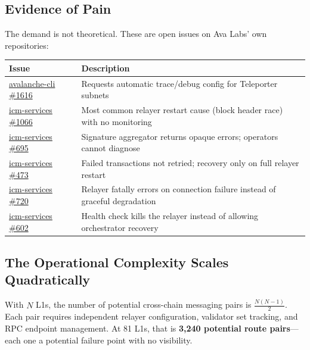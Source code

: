 \documentclass[11pt,a4paper]{article}
\begin{document}
\subsection{Evidence of Pain}

The demand is not theoretical. These are open issues on Ava Labs' own repositories:

\begin{table}[h]
\centering
\small
\begin{tabularx}{\textwidth}{@{}l L{10cm}@{}}
\toprule
\textbf{Issue} & \textbf{Description} \\
\midrule
\href{https://github.com/ava-labs/avalanche-cli/issues/1616}{avalanche-cli \#1616} & Requests automatic trace/debug config for Teleporter subnets \\
\href{https://github.com/ava-labs/icm-services/issues/1066}{icm-services \#1066} & Most common relayer restart cause (block header race) with no monitoring \\
\href{https://github.com/ava-labs/icm-services/issues/695}{icm-services \#695} & Signature aggregator returns opaque errors; operators cannot diagnose \\
\href{https://github.com/ava-labs/icm-services/issues/473}{icm-services \#473} & Failed transactions not retried; recovery only on full relayer restart \\
\href{https://github.com/ava-labs/icm-services/issues/720}{icm-services \#720} & Relayer fatally errors on connection failure instead of graceful degradation \\
\href{https://github.com/ava-labs/icm-services/issues/602}{icm-services \#602} & Health check kills the relayer instead of allowing orchestrator recovery \\
\bottomrule
\end{tabularx}
\end{table}

\subsection{The Operational Complexity Scales Quadratically}

With $N$ L1s, the number of potential cross-chain messaging pairs is $\frac{N(N-1)}{2}$. Each pair requires independent relayer configuration, validator set tracking, and RPC endpoint management. At 81 L1s, that is \textbf{3,240 potential route pairs}---each one a potential failure point with no visibility.

\end{document}
